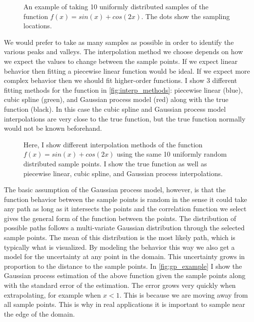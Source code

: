 \begin{figure}[htb]
  \centering
  {\tiny }
  \caption[The function $f(x) = sin(x) + cos(2x)$ uniformly sampled with 10 points]{%
    An example of taking 10 uniformly distributed samples of the function
    $f(x) = sin(x) + cos(2x)$.  The dots show the sampling locations.
  }
  \label{fig:reconstruction_sampling}
\end{figure}

We would prefer to take as many samples as possible in order to identify
the various peaks and valleys.
The interpolation method we choose depends on how we expect the values to
change between the sample points.
If we expect linear behavior then fitting a
piecewise linear function would be ideal.  If we expect more complex behavior
then we should fit higher-order functions.  I show 3 different fitting 
methods for the function in \autoref{fig:interp_methods}: piecewise linear (blue), 
cubic spline (green), and Gaussian process model (red) along with the true
function (black).  In this case the cubic spline and Gaussian process model
interpolations are very close to the true function, but the true function
normally would not be known beforehand.

\begin{figure}[htb]
  \centering
  {\tiny }
  \caption[Example of different interpretation methods]{%
    Here, I show different interpolation methods of the function
    $f(x) = sin(x) + cos(2x)$ using the same 10 uniformly random distributed
    sample points.  I show the true function as well as piecewise linear,
    cubic spline, and Gaussian process interpolations.
  }
  \label{fig:interp_methods}
\end{figure}

The basic assumption of the Gaussian process model, however, is that the
function behavior between the sample points is random in the sense it could
take any path as long as it intersects the points and the correlation function
we select gives the general form of the function between the points.
The distribution of possible paths follows a multi-variate Gaussian
distribution through the selected sample points.  The mean of this 
distribution is the most likely path, which is typically what is visualized.
By modeling the behavior this way we also get a model for the uncertainty
at any point in the domain.  This uncertainty grows in proportion to the
distance to the sample points.  In \autoref{fig:gp_example} I show the Gaussian
process estimation of the above function given the sample points along with
the standard error of the estimation.  The error grows very quickly when
extrapolating, for example when $x < 1$.  This is 
because we are moving away from all sample points.  This is why in real 
applications it is important to sample near the edge of the domain.

